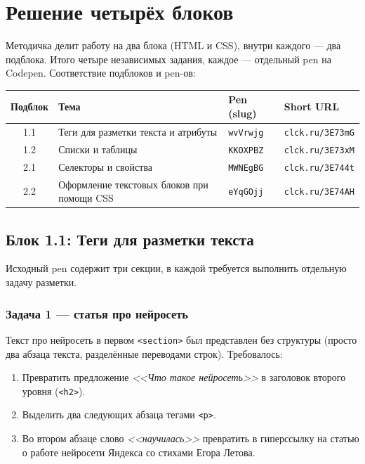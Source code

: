 \chapter{Решение четырёх блоков}
\label{ch:practice}

Методичка делит работу на два блока (HTML и CSS), внутри каждого --- два
подблока. Итого четыре независимых задания, каждое --- отдельный pen на
Codepen. Соответствие подблоков и pen-ов:

\begin{center}
\begin{tabular}{|c|l|l|l|}
\hline
\textbf{Подблок} & \textbf{Тема} & \textbf{Pen (slug)} & \textbf{Short URL} \\
\hline
1.1 & Теги для разметки текста и атрибуты            & \texttt{wvVrwjg} & \texttt{clck.ru/3E73mG} \\
1.2 & Списки и таблицы                                & \texttt{KKOXPBZ} & \texttt{clck.ru/3E73xM} \\
2.1 & Селекторы и свойства                            & \texttt{MWNEgBG} & \texttt{clck.ru/3E744t} \\
2.2 & Оформление текстовых блоков при помощи CSS      & \texttt{eYqGOjj} & \texttt{clck.ru/3E74AH} \\
\hline
\end{tabular}
\end{center}

\section{Блок 1.1: Теги для разметки текста}

Исходный pen содержит три секции, в каждой требуется выполнить отдельную
задачу разметки.

\subsection{Задача 1 --- статья про нейросеть}

Текст про нейросеть в первом \texttt{<section>} был представлен без
структуры (просто два абзаца текста, разделённые переводами строк).
Требовалось:
\begin{enumerate}
  \item Превратить предложение \textit{<<Что такое нейросеть>>} в
        заголовок второго уровня (\texttt{<h2>}).
  \item Выделить два следующих абзаца тегами \texttt{<p>}.
  \item Во втором абзаце слово \textit{<<научилась>>} превратить
        в гиперссылку на статью о работе нейросети Яндекса со
        стихами Егора Летова.
\end{enumerate}

